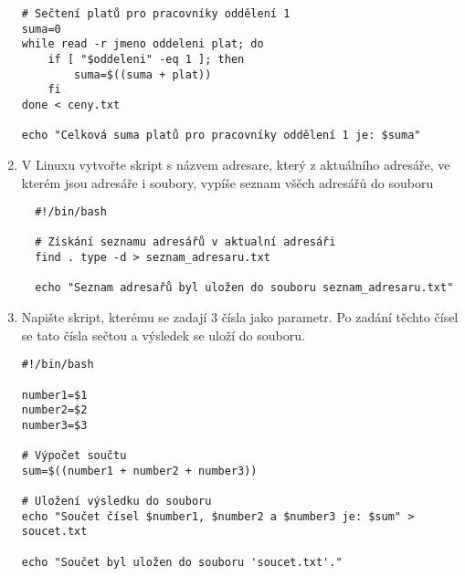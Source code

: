 \documentclass{article}
\begin{document}
\begin{enumerate}
\begin{lstlisting}[caption=skript secti.sh]
# Sečtení platů pro pracovníky oddělení 1
suma=0
while read -r jmeno oddeleni plat; do
    if [ "$oddeleni" -eq 1 ]; then
        suma=$((suma + plat))
    fi
done < ceny.txt

echo "Celková suma platů pro pracovníky oddělení 1 je: $suma"
\end{lstlisting}
\item V Linuxu vytvořte skript s názvem adresare, který z aktuálního adresáře, ve kterém jsou adresáře i soubory, vypíše seznam všěch adresářů do souboru
\begin{lstlisting}
  #!/bin/bash

  # Získání seznamu adresářů v aktualní adresáři
  find . type -d > seznam_adresaru.txt

  echo "Seznam adresařů byl uložen do souboru seznam_adresaru.txt"
\end{lstlisting}
\item Napište skript, kterému se zadají 3 čísla jako parametr. Po zadání těchto čísel se tato čísla sečtou a výsledek se uloží do souboru.
\begin{lstlisting}
#!/bin/bash

number1=$1
number2=$2
number3=$3

# Výpočet součtu
sum=$((number1 + number2 + number3))

# Uložení výsledku do souboru
echo "Součet čísel $number1, $number2 a $number3 je: $sum" > soucet.txt

echo "Součet byl uložen do souboru 'soucet.txt'."
\end{lstlisting}
\end{enumerate}
\end{document}
